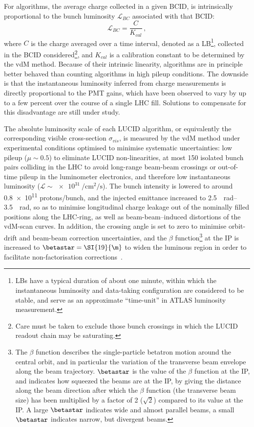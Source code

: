 \documentclass[cernpreprint, atlasdraft=false, UKenglish,british,orcidlogo, texmf, orcidlogo]{atlasdoc}
\begin{document}
For \CHARGE algorithms, the average charge collected in a given \gls{BCID}, is intrinsically proportional to the bunch luminosity $\mathcal{L}_{BC}$ associated with that \gls{BCID}:
\begin{equation}
\mathcal{L}_{BC}=\frac{C}{K_{cal}}\, ,
\end{equation}
where $C$ is the charge averaged over a time interval, denoted as a \gls{LB}\footnote{\glspl{LB} have a typical duration of about one minute, within which the instantaneous luminosity and data-taking configuration are considered to be stable, and serve as an approximate ``time-unit'' in ATLAS luminosity measurement.}, collected in the \gls{BCID} considered\footnote{Care must be taken to exclude those bunch crossings in which the \gls{LUCID} \analog readout chain may be saturating.}, and $K_{cal}$ is a calibration constant to be determined by the  \gls{vdM} method. Because of their intrinsic linearity, \CHARGE algorithms are in principle better behaved than \HIT counting algorithms in high pileup conditions. The downside is that the instantaneous luminosity inferred from charge measurements is directly proportional to the \gls{PMT} gains, which have been observed to vary by up to a few percent over the course of a single \gls{LHC} fill. Solutions to compensate for this disadvantage are still under study.
 
The absolute luminosity scale of each \gls{LUCID} algorithm, or equivalently the corresponding visible cross-section $\sigma_{vis}$, is measured by the \gls{vdM} method under experimental conditions optimised to minimise systematic uncertainties: low pileup ($\mu \sim 0.5$) to eliminate \gls{LUCID} non-linearities, at most 150 isolated bunch pairs colliding in the \gls{LHC} to avoid long-range beam-beam crossings or out-of-time pileup in the luminometer electronics, and therefore low instantaneous luminosity ($\mathcal{L} \sim \SI{e31}{\per\cm\squared\per\s}$). The bunch intensity is lowered to around \num{0.8e11} protons/bunch, and the injected emittance increased to  \SIrange[range-phrase = --]{2.5}{3.5}{\micron\radian}, so as to minimise longitudinal charge leakage out of the nominally filled positions along the \gls{LHC}-ring, as well as beam-beam--induced distortions of the \gls{vdM}-scan curves. In addition, the crossing angle is set to zero to minimise orbit-drift and beam-beam correction uncertainties, and the $\beta$ function\footnote{The $\beta$ function describes the single-particle betatron motion around the central orbit, and in particular the variation of the transverse beam envelope along the beam trajectory. $\betastar$ is the value of the $\beta$ function at the \gls{IP}, and indicates how squeezed the beams are at the \gls{IP}, by giving the distance along the beam direction after which the $\beta$ function (the transverse beam size) has been multiplied by a factor of 2 ($\sqrt{2}$) compared to its value at the \gls{IP}. A large $\betastar$ indicates wide and almost parallel beams, a small $\betastar$ indicates narrow, but divergent beams.} at the \gls{IP} is increased to $\betastar = \SI{19}{\m}$ to widen the luminous region in order to facilitate non-factorisation corrections~\cite{DAPR-2013-01, ATLAS-CONF-2019-021}.
 
\end{document}
